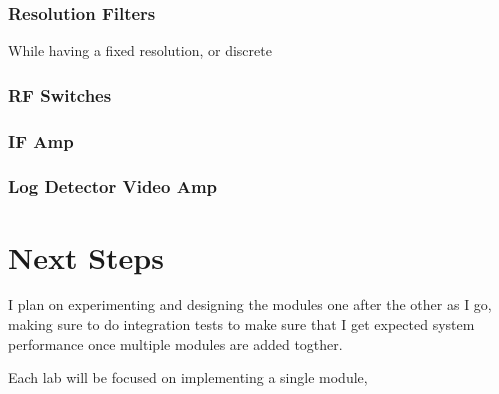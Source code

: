 \subsubsection{Resolution Filters}

While having a fixed resolution, or discrete 

\subsubsection{RF Switches}

\subsubsection{IF Amp}

\subsubsection{Log Detector Video Amp}

\section{Next Steps}

I plan on experimenting and designing the modules one after the other as I go,
making sure to do integration tests to make sure that I get expected system
performance once multiple modules are added togther.

Each lab will be focused on implementing a single module, 

